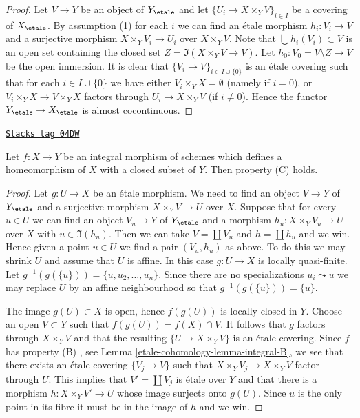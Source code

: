 \begin{proof}
Let $V \to Y$ be an object of $Y_\etale$ and let
$\{U_i \to X \times_Y V\}_{i \in I}$ be a covering of $X_\etale$.
By assumption (1) for each $i$ we can find an \'etale morphism
$h_i : V_i \to V$ and a surjective morphism $X \times_Y V_i \to U_i$
over $X \times_Y V$. Note that $\bigcup h_i(V_i) \subset V$ is an
open set containing the closed set $Z = \Im(X \times_Y V \to V)$.
Let $h_0 : V_0 = V \setminus Z \to V$ be the open immersion.
It is clear that $\{V_i \to V\}_{i \in I \cup \{0\}}$ is an
\'etale covering such that for each $i \in I \cup \{0\}$ we have
either $V_i \times_Y X = \emptyset$ (namely if $i = 0$), or
$V_i \times_Y X \to V \times_Y X$ factors through $U_i \to X \times_Y V$
(if $i \not = 0$). Hence the functor $Y_\etale \to X_\etale$
is almost cocontinuous.
\end{proof}

\begin{lemma}
\label{etale-cohomology-lemma-integral-homeo-onto-image-C}
\href{https://stacks.math.columbia.edu/tag/04DW}{\texttt{Stacks tag 04DW}}

Let $f : X \to Y$ be an integral morphism of schemes which defines
a homeomorphism of $X$ with a closed subset of $Y$.
Then property (C) holds.
\end{lemma}

\begin{proof}
Let $g : U \to X$ be an \'etale morphism. We need to find an object
$V \to Y$ of $Y_\etale$ and a surjective morphism $X \times_Y V \to U$
over $X$. Suppose that for every $u \in U$ we can find an object
$V_u \to Y$ of $Y_\etale$ and a morphism $h_u : X \times_Y V_u \to U$
over $X$ with $u \in \Im(h_u)$. Then we can take $V = \coprod V_u$
and $h = \coprod h_u$ and we win. Hence given a point
$u \in U$ we find a pair $(V_u, h_u)$ as above. To do this we may
shrink $U$ and assume that $U$ is affine. In this case
$g : U \to X$ is locally quasi-finite. Let
$g^{-1}(g(\{u\})) = \{u, u_2, \ldots, u_n\}$. Since there are no
specializations $u_i \leadsto u$ we may replace $U$ by an affine neighbourhood
so that $g^{-1}(g(\{u\})) = \{u\}$.

\medskip\noindent
The image $g(U) \subset X$ is open,
hence $f(g(U))$ is locally closed in $Y$. Choose an open $V \subset Y$ such
that $f(g(U)) = f(X) \cap V$. It follows that $g$ factors through
$X \times_Y V$ and that the resulting $\{U \to X \times_Y V\}$ is an \'etale
covering. Since $f$ has property (B) , see
Lemma \ref{etale-cohomology-lemma-integral-B},
we see that there exists an \'etale covering $\{V_j \to V\}$ such that
$X \times_Y V_j \to X \times_Y V$ factor through $U$.
This implies that $V' = \coprod V_j$ is \'etale over $Y$ and that there is a
morphism $h : X \times_Y V' \to U$ whose image
surjects onto $g(U)$. Since $u$ is the only point in its fibre it must
be in the image of $h$ and we win.
\end{proof}

